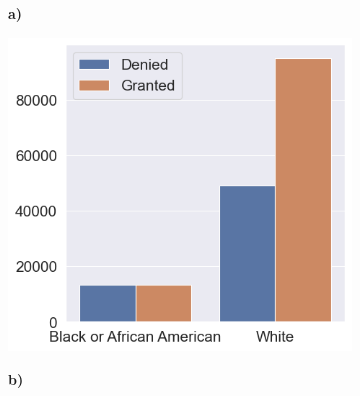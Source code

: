 \begin{figure}[!htbp]

    \centering

    \begin{minipage}[b]{0.5\textwidth}
        \centering
        \begin{subfigure}[t]{0.06\textwidth}
            \textbf{a)}
        \end{subfigure}
        \begin{subfigure}[t]{0.9\textwidth}
            \includegraphics[width=\linewidth, valign=t]{images/loan_grants_by_protected_attributes/initial.png}
        \end{subfigure}
    \end{minipage}%
    \begin{minipage}[b]{0.5\textwidth}
        \centering
        \begin{subfigure}[t]{0.06\textwidth}
            \textbf{b)}
        \end{subfigure}
        \begin{subfigure}[t]{0.9\textwidth}

\end{subfigure}
\end{minipage}
\end{figure}
